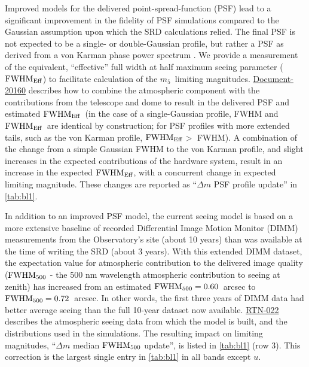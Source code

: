 \documentclass[PST,authoryear,toc]{lsstdoc}
\newcommand{\mf}{\ensuremath{m_5}}
\newcommand{\fwhme}{\ensuremath{{\rm FWHM}_\mathrm{Eff}}}
\begin{document}
Improved models for the delivered point-spread-function (PSF) lead to a significant improvement in the fidelity of PSF simulations compared to the Gaussian assumption upon which the SRD calculations relied. The final PSF is not expected to be a single- or double-Gaussian profile, but rather a PSF as derived from a von Karman phase power spectrum \citep{Xin_2018, Fetick18}.  We provide a measurement of the equivalent, ``effective'' full width at half maximum seeing parameter (\fwhme) to facilitate calculation of the \mf\ limiting magnitudes. \href{https://docushare.lsst.org/docushare/dsweb/Get/Document-20160}{{Document-20160}} describes how to combine the atmospheric component with the contributions from the telescope and dome to result in the delivered PSF and estimated \fwhme\ (in the case of a single-Gaussian profile, FWHM and \fwhme\ are identical by construction; for PSF profiles with more extended tails, such as the von Karman profile, \fwhme $>$ FWHM).
A combination of the change from a simple Gaussian FWHM to the von Karman profile, and slight increases in the expected contributions of the hardware system, result in an increase in the expected \fwhme, with a concurrent change in expected limiting magnitude. These changes are reported as ``$\Delta m$ PSF profile update'' in \autoref{tab:bl1}.



In addition to an improved PSF model, the current seeing model is based on a more extensive baseline of recorded Differential Image Motion Monitor (DIMM) measurements from the Observatory's site (about 10 years) than was available at the time of writing the SRD (about 3 years). With this extended DIMM dataset, the expectation value for atmospheric contribution to the delivered image quality (${\rm FWHM}_{500}$ - the 500 nm wavelength atmospheric contribution to seeing at zenith) has increased from an estimated ${\rm FWHM}_{500} = 0.60$~arcsec to ${\rm FWHM}_{500} = 0.72$~arcsec. In other words, the first three years of DIMM data had better average seeing than the full 10-year dataset now available. \href{https://rtn-022.lsst.io}{{RTN-022}} describes the atmospheric seeing data from which the model is built, and the distributions used in the simulations. The resulting impact on limiting magnitudes, ``$\Delta m$ median ${\rm FWHM}_{500}$ update'', is listed in \autoref{tab:bl1} (row 3). This correction is the largest single entry in \autoref{tab:bl1} in all bands except $u$.
\end{document}
